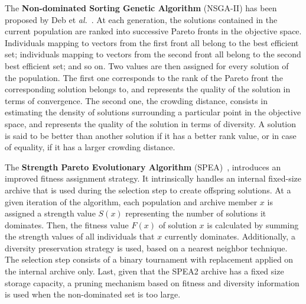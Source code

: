 \documentclass{llncs}
\begin{document}

The {\bf Non-dominated Sorting Genetic Algorithm} (NSGA-II) has been proposed by Deb et \textit{al.}~\cite{Deb2002}. %
At each generation, the solutions contained in the current  population are ranked into successive Pareto fronts in the objective space. Individuals mapping to vectors from the first front all belong to
the best efficient set; individuals mapping to vectors from the second front all belong to the second best efficient set; and so on.
Two values are then assigned for every solution of the population. The first one corresponds to the rank of the Pareto front the corresponding solution
belongs to, and represents the quality of the solution in terms of convergence. The second one, the crowding distance, consists in
estimating the density of solutions surrounding a particular point in the objective space, and represents the quality of the solution in
terms of diversity.  A solution is said to be better than another solution if it has a better rank value, or in case of equality, if it has a larger crowding distance.

The {\bf Strength Pareto Evolutionary Algorithm} (SPEA)~\cite{Zitzler2001}, introduces an improved fitness assignment strategy. It intrinsically handles an internal fixed-size archive that is used during the selection step to create offspring solutions. At a given iteration of the algorithm, each population and archive member $x$ is assigned a strength value $S(x)$ representing the number
of solutions it dominates. Then, the fitness value $F (x)$ of solution $x$ is calculated by summing the strength values of all individuals that $x$ currently dominates. Additionally,
a diversity preservation strategy is used, based on a nearest neighbor technique.
The selection step consists of a binary tournament with replacement applied on the internal archive only.
Last, given that the SPEA2 archive has a fixed size storage capacity, a pruning mechanism based on fitness and diversity information is used when the non-dominated set is too large. 
\end{document}
